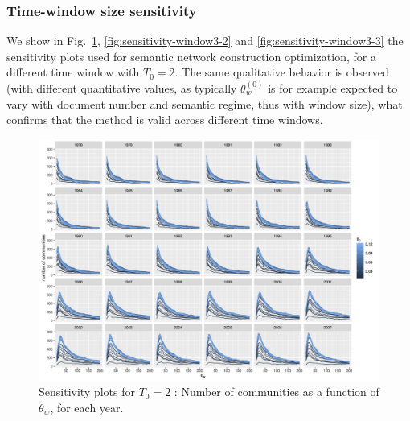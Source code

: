 \documentclass[12pt,twoside,a4paper]{article}
\begin{document}
\subsubsection*{Time-window size sensitivity}


We show in Fig.~\ref{fig:sensitivity-window3-1}, \ref{fig:sensitivity-window3-2} and \ref{fig:sensitivity-window3-3} the sensitivity plots used for semantic network construction optimization, for a different time window with $T_0 = 2$. The same qualitative behavior is observed (with different quantitative values, as typically $\theta_w^{(0)}$ is for example expected to vary with document number and semantic regime, thus with window size), what confirms that the method is valid across different time windows.


\begin{figure}
\centering
\includegraphics[width=\textheight,height=\textwidth,angle=90]{commnum_thetaw_byyears_window3.jpg}
\caption{Sensitivity plots for $T_0 = 2$ : Number of communities as a function of $\theta_w$, for each year.}
\label{fig:sensitivity-window3-1}
\end{figure}
\end{document}
